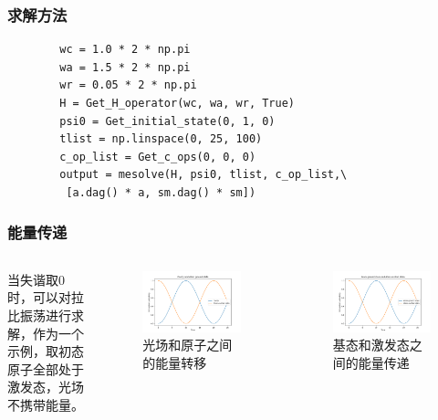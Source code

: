 \documentclass[aspectratio=169, 12pt]{beamer}
\begin{document}
\begin{frame}[fragile]
    \frametitle{求解方法}
    \begin{verbatim}
        wc = 1.0 * 2 * np.pi
        wa = 1.5 * 2 * np.pi
        wr = 0.05 * 2 * np.pi
        H = Get_H_operator(wc, wa, wr, True)
        psi0 = Get_initial_state(0, 1, 0)
        tlist = np.linspace(0, 25, 100)
        c_op_list = Get_c_ops(0, 0, 0)
        output = mesolve(H, psi0, tlist, c_op_list,\
         [a.dag() * a, sm.dag() * sm])
    \end{verbatim}
\end{frame}

\begin{frame}
    \frametitle{能量传递}
    \begin{columns}
    当失谐取0时，可以对拉比振荡进行求解，作为一个示例，取初态原子全部处于激发态，光场不携带能量。
    \begin{figure}
        \centering
        \includegraphics[width=1.0\linewidth]{3.png}
        \caption{光场和原子之间的能量转移}
        \label{fig:3}
    \end{figure}
    \begin{figure}
        \centering
        \includegraphics[width=1.0\linewidth]{2.png}
        \caption{基态和激发态之间的能量传递}
        \label{fig:2}
    \end{figure}
    \end{columns}
\end{frame}
\end{document}

